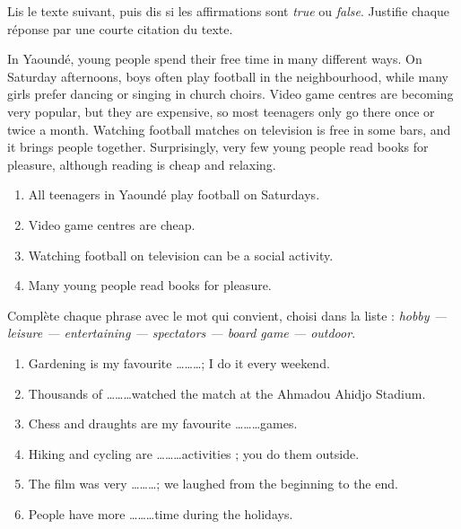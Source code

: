 \documentclass[11pt]{article}
\begin{document}
\begin{exercice}
Lis le texte suivant, puis dis si les affirmations sont \emph{true} ou \emph{false}. Justifie chaque réponse par une courte citation du texte.
\begin{textebox}
In Yaoundé, young people spend their free time in many different ways. On Saturday afternoons, boys often play football in the neighbourhood, while many girls prefer dancing or singing in church choirs. Video game centres are becoming very popular, but they are expensive, so most teenagers only go there once or twice a month. Watching football matches on television is free in some bars, and it brings people together. Surprisingly, very few young people read books for pleasure, although reading is cheap and relaxing.
\end{textebox}
\begin{enumerate}
\item All teenagers in Yaoundé play football on Saturdays.
\item Video game centres are cheap.
\item Watching football on television can be a social activity.
\item Many young people read books for pleasure.
\end{enumerate}
\end{exercice}

\begin{exercice}
Complète chaque phrase avec le mot qui convient, choisi dans la liste : \emph{hobby — leisure — entertaining — spectators — board game — outdoor}.
\begin{enumerate}
\item Gardening is my favourite \ldots\ldots\ldots ; I do it every weekend.
\item Thousands of \ldots\ldots\ldots watched the match at the Ahmadou Ahidjo Stadium.
\item Chess and draughts are my favourite \ldots\ldots\ldots games.
\item Hiking and cycling are \ldots\ldots\ldots activities ; you do them outside.
\item The film was very \ldots\ldots\ldots ; we laughed from the beginning to the end.
\item People have more \ldots\ldots\ldots time during the holidays.
\end{enumerate}
\end{exercice}
\end{document}

